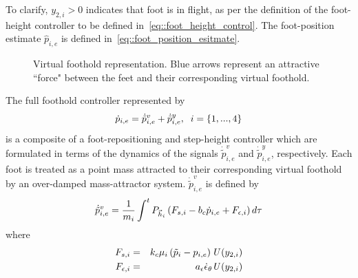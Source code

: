 		\noindent To clarify, $y_{2,i}>0$ indicates that \Ith foot is in flight, as per the definition of the foot-height controller to be defined in~\ref{eq::foot_height_control}. The foot-position estimate $\hat{p}_{i,e}$ is defined in~\ref{eq::foot_position_esitmate}.

			\begin{figure}[!h]
				\centering
				\caption{Virtual foothold representation. Blue arrows represent an attractive ``force" between the feet and their corresponding virtual foothold.}
				\label{fig::virtial_foothold}
			\end{figure}
		The full foothold controller represented by 
			\begin{equation}
				\dot{p}_{i,e} = \dot{\tilde{p}}_{i,e}^{v} + \dot{\tilde{p}}_{i,e}^{y}, \hspace{2mm} i = \{1,...,4\}
			\end{equation} 
		is a composite of a foot-repositioning and step-height controller which are formulated in terms of the dynamics of the signals $\dot{\tilde{p}}_{i,e}^{v}$ and $\dot{\tilde{p}}_{i,e}^{y}$, respectively. Each foot is treated as a point mass attracted to their corresponding virtual foothold by an over-damped mass-attractor system. $\dot{\tilde{p}}_{i,e}^{v}$ is defined by
			\begin{equation}
				\dot{\tilde{p}}_{i,e}^{v} 		= \frac{1}{m_{i}} \int^t{{P}_{\vec{h}_{i}} \left( F_{s,i}  -b_{c} \dot{p}_{i,e} + F_{\epsilon,i} \right) d\tau}
				\label{eq::foot_place_control}
			\end{equation}
		where
			\begin{eqnarray*}
				F_{s,i} 			& = & k_{c}  \mu_{i} \left( \tilde{p}_{i} - {p}_{i,e} \right) \emph{U}\left(y_{2,i}\right)		\nonumber\\
				F_{\epsilon,i}		& = & a_{\epsilon}\dot{\epsilon}_{\theta} \emph{U}\left(y_{2,i}\right)						\nonumber
			\end{eqnarray*}
